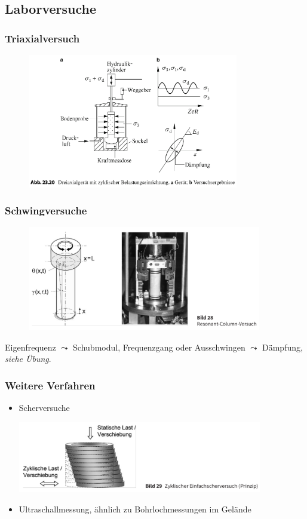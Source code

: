 \subsection{Laborversuche}


\begin{frame}
\frametitle{Triaxialversuch}

\begin{figure}
\includegraphics[width=0.82\textwidth]{fig_img/triaxial_test.png}
\cite{Schmidt2017}
\end{figure}
\end{frame}


\begin{frame}
\frametitle{Schwingversuche}

\begin{figure}
\includegraphics[width=0.91\textwidth]{fig_img/resonant_column.png}
\cite{Vrettos2017}
\end{figure}

Eigenfrequenz $\leadsto$ Schubmodul, Frequenzgang oder Ausschwingen $\leadsto$ Dämpfung, \textsl{siehe Übung}.
\end{frame}


\begin{frame}
\frametitle{Weitere Verfahren}
\begin{itemize}
 \item Scherversuche 

        \includegraphics[width=0.84\textwidth]{fig_img/shear_test.png} \cite{Vrettos2017}
 
 \item Ultraschallmessung, ähnlich zu Bohrlochmessungen im Gelände
\end{itemize}



\end{frame}
